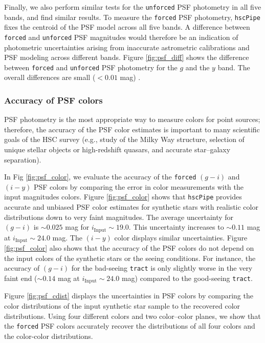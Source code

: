 \documentclass[useamsfonts]{pasj01}
\def\hscpipe{\texttt{hscPipe}}
\def\forced{\texttt{forced}}
\def\unforced{\texttt{unforced}}
\def\tract{\texttt{tract}}
\begin{document}
	Finally, we also perform similar tests for the \unforced{} PSF photometry in all 
	five bands, and find similar results. 
	To measure the \forced{} PSF photometry, \hscpipe{} fixes the centroid of the PSF 
	model across all five bands. 
	A difference between \forced{} and \unforced{} PSF magnitudes would therefore be 
	an indication of photometric uncertainties arising from  inaccurate astrometric 
	calibrations and PSF modeling across different bands. 
	Figure \ref{fig:psf_diff} shows the difference between \forced{} and \unforced{} 
	PSF photometry for the $g$ and the $y$ band. 
	The overall differences are small ($<0.01$ mag) .

\subsubsection{Accuracy of PSF colors}

    PSF photometry is the most appropriate way to measure colors for point
    sources; therefore, the accuracy of the PSF color estimates is important to many 
    scientific goals of the HSC survey
    (e.g., study of the Milky Way structure, selection of unique stellar objects or
    high-redshift quasars, and accurate star--galaxy separation).

    In Fig \ref{fig:psf_color}, we evaluate the accuracy of the \forced{} $(g-i)$
    and $(i-y)$ PSF colors by comparing the error in color measurements with the input magnitudes colors. Figure  \ref{fig:psf_color} shows that \hscpipe{} provides accurate and unbiased PSF color
    estimates for synthetic stars with realistic color distributions down to very 
    faint magnitudes. The average uncertainty for $(g-i)$ is  ${\sim}0.025$ mag for $i_{\mathrm{Input}}{\sim}19.0$. This uncertainty increases to ${\sim}0.11$ mag at
    $i_{\mathrm{Input}}{\sim}24.0$ mag.  The $(i-y)$ color displays similar uncertainties. Figure \ref{fig:psf_color} also shows that the accuracy of the PSF colors do not depend on the input colors of the synthetic stars or the seeing conditions. For instance, the accuracy of $(g-i)$ for the bad-seeing \tract{} is only
    slightly worse in the very faint end (${\sim}0.14$ mag at
    $i_{\mathrm{Input}}{\sim}24.0$ mag) compared to the 
    good-seeing \tract{}.

Figure \ref{fig:psf_cdist} displays the uncertainties in PSF colors  by comparing the color distributions of the input synthetic star sample to the recovered color distributions. Using four different colors and two color--color planes, we show that the 
    \forced{} PSF colors accurately recover the distributions of all four colors 
    and the color-color distributions.
\end{document}
